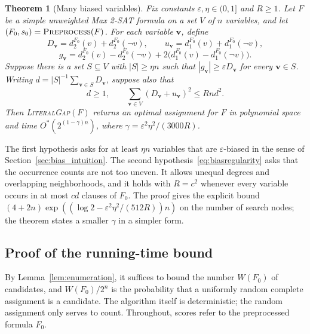 \documentclass[11pt,a4paper]{article}
\newtheorem{theorem}{Theorem}[section]
\theoremstyle{definition}
\theoremstyle{remark}
\newcommand{\Ostar}{O^{*}}
\begin{document}
\begin{theorem}[Many biased variables]\label{thm:bias}
Fix constants $\varepsilon,\eta\in(0,1]$ and $R\ge1$.
Let $F$ be a simple unweighted Max 2-SAT formula on a set $V$ of $n$ variables,
and let $(F_0,s_0)=\textnormal{\textsc{Preprocess}}(F)$. For each variable
$\mathbf v$, define
\[
 D_{\mathbf v}=d_2^{F_0}(v)+d_2^{F_0}(\neg v),\qquad
 u_{\mathbf v}=d_1^{F_0}(v)+d_1^{F_0}(\neg v),
\]
\[
 g_{\mathbf v}=d_2^{F_0}(v)-d_2^{F_0}(\neg v)
                    +2\bigl(d_1^{F_0}(v)-d_1^{F_0}(\neg v)\bigr).
\]
Suppose there is a set $S\subseteq V$ with $|S|\ge\eta n$ such that
$|g_{\mathbf v}|\ge\varepsilon D_{\mathbf v}$ for every $\mathbf v\in S$.
Writing $d=|S|^{-1}\sum_{\mathbf v\in S}D_{\mathbf v}$, suppose also that
\begin{equation}
 d\ge1,\qquad
 \sum_{\mathbf v\in V}(D_{\mathbf v}+u_{\mathbf v})^2\le Rnd^2.
 \label{eq:biasregularity}
\end{equation}
Then \textnormal{\textsc{LiteralGap}}$(F)$ returns an optimal assignment for
$F$ in polynomial space and time $\Ostar(2^{(1-\gamma)n})$, where
$\gamma=\varepsilon^2\eta^2/(3000R)$.
\end{theorem}

The first hypothesis asks for at least $\eta n$ variables that are
$\varepsilon$-biased in the sense of Section~\ref{sec:bias_intuition}. The
second hypothesis~\eqref{eq:biasregularity} asks that the occurrence counts
are not too uneven. It allows unequal degrees and overlapping
neighborhoods, and it holds with $R=c^2$ whenever every variable occurs in
at most $cd$ clauses of $F_0$. The proof gives the explicit bound
$(4+2n)\exp((\log2-\varepsilon^2\eta^2/(512R))n)$ on the number of search
nodes; the theorem states a smaller $\gamma$ in a simpler form.

\subsection{Proof of the running-time bound}

By Lemma~\ref{lem:enumeration}, it suffices to bound the number $W(F_0)$
of candidates, and $W(F_0)/2^n$ is the probability that a uniformly random
complete assignment is a candidate. The algorithm itself is deterministic;
the random assignment only serves to count. Throughout, scores refer to the
preprocessed formula $F_0$.
\end{document}
